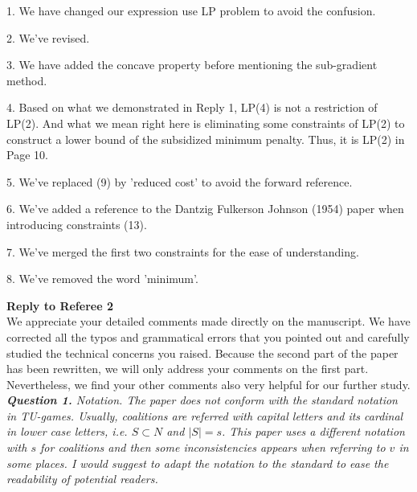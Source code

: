 \documentclass[11pt]{article}
\begin{document}
1. We have changed our expression use LP problem to avoid the confusion.

2. We've revised.

3. We have added the concave property before mentioning the sub-gradient method.

4. Based on what we demonstrated in Reply 1, LP(4) is not a restriction of LP(2). And what we mean right here is eliminating some constraints of LP(2) to construct a lower bound of the subsidized minimum penalty. Thus, it is LP(2) in Page 10.

5. We've replaced (9) by 'reduced cost' to avoid the forward reference.

6. We've added a reference to the Dantzig Fulkerson Johnson (1954) paper when introducing constraints (13).

7. We've merged the first two constraints for the ease of understanding.

8. We've removed the word 'minimum'.
\\[4mm]

\newpage

\noindent \textbf{\large Reply to Referee 2}
\\[3mm]
We appreciate your detailed comments made directly on the manuscript.
We have corrected all the typos and grammatical errors that you pointed out and carefully studied the technical concerns you raised.
Because the second part of the paper has been rewritten, we will only address your comments on the first part.
Nevertheless, we find your other comments also very helpful for our further study.
\\[4mm]
%
%
%
%
\noindent \textit{\textbf{Question 1.}
Notation. The paper does not conform with the standard notation in
TU-games. Usually, coalitions are referred with capital letters and its
cardinal in lower case letters, i.e. $S \subset N$ and $|S| = s$. This paper uses a different notation with $s$ for coalitions and then some inconsistencies
appears when referring to $v$ in some places. I would suggest to adapt
the notation to the standard to ease the readability of potential readers.}
\end{document}
